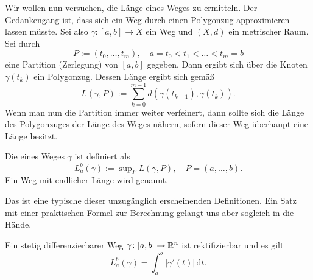 Wir wollen nun versuchen, die Länge eines Weges zu ermitteln.
Der Gedankengang ist, dass sich ein Weg durch einen Polygonzug
approximieren lassen müsste. Sei also $\gamma\colon [a,b]\to X$
ein Weg und $(X,d)$ ein metrischer Raum. Sei durch%
\begin{equation}
P:=(t_0,\ldots,t_m),\quad a=t_0<t_1<\ldots <t_m=b
\end{equation}
eine Partition (Zerlegung) von $[a,b]$ gegeben. Dann ergibt sich
über die Knoten $\gamma(t_k)$ ein Polygonzug. Dessen Länge ergibt
sich gemäß%
\begin{equation}
L(\gamma,P) := \sum_{k=0}^{m-1} d(\gamma(t_{k+1}),\gamma(t_k)).
\end{equation}
Wenn man nun die Partition immer weiter verfeinert, dann sollte
sich die Länge des Polygonzuges der Länge des Weges nähern, sofern
dieser Weg überhaupt eine Länge besitzt.
\begin{definition}
Die  eines Weges $\gamma$ ist definiert als%
\begin{equation}
L_a^b(\gamma) := \sup\nolimits_P L(\gamma,P), \quad P=(a,\ldots,b).
\end{equation}
Ein Weg mit endlicher Länge wird  genannt.
\end{definition}
Das ist eine typische dieser unzugänglich erscheinenden Definitionen.
Ein Satz mit einer praktischen Formel zur Berechnung gelangt uns
aber sogleich in die Hände.
\begin{theorem}
Ein stetig differenzierbarer Weg $\gamma\colon [a,b]\to\mathbb R^n$ ist
rektifizierbar und es gilt%
\begin{equation}
L_a^b(\gamma) = \int_a^b |\gamma'(t)|\,\mathrm dt.
\end{equation}
\end{theorem}

